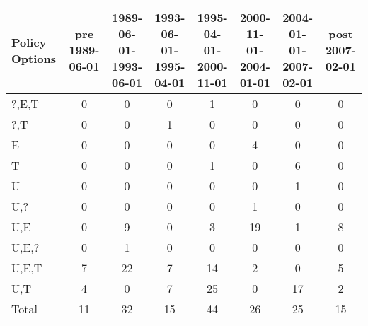 \begin{tabular}{lccccccc}
\hline\hline 
\addlinespace 
Policy Options & pre 1989-06-01 & \shortstack{1989-06-01- \\ 1993-06-01} & \shortstack{1993-06-01- \\ 1995-04-01} & \shortstack{1995-04-01- \\ 2000-11-01} & \shortstack{2000-11-01- \\ 2004-01-01} & \shortstack{2004-01-01- \\ 2007-02-01} & post 2007-02-01 \\ 
\hline 
?,E,T & 0 & 0 & 0 & 1 & 0 & 0 & 0 \\
?,T & 0 & 0 & 1 & 0 & 0 & 0 & 0 \\
E & 0 & 0 & 0 & 0 & 4 & 0 & 0 \\
T & 0 & 0 & 0 & 1 & 0 & 6 & 0 \\
U & 0 & 0 & 0 & 0 & 0 & 1 & 0 \\
U,? & 0 & 0 & 0 & 0 & 1 & 0 & 0 \\
U,E & 0 & 9 & 0 & 3 & 19 & 1 & 8 \\
U,E,? & 0 & 1 & 0 & 0 & 0 & 0 & 0 \\
U,E,T & 7 & 22 & 7 & 14 & 2 & 0 & 5 \\
U,T & 4 & 0 & 7 & 25 & 0 & 17 & 2 \\
\addlinespace 
Total & 11 & 32 & 15 & 44 & 26 & 25 & 15 \\
\hline 
\end{tabular}